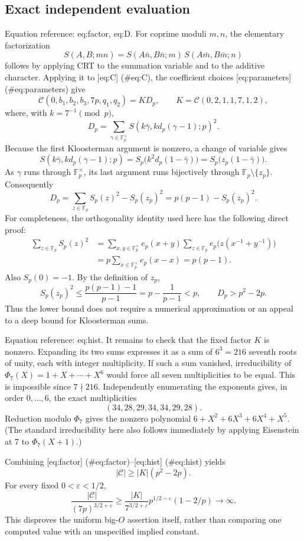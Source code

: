\documentclass[10pt]{article}
\begin{document}
\subsection*{Exact independent evaluation}
Equation reference: eq:factor, eq:D. For coprime moduli \(m,n\), the elementary factorization \[S(A,B;mn)=
 S(A\bar n,B\bar n;m)\,S(A\bar m,B\bar m;n)\] follows by applying CRT to the summation variable and to the additive character. Applying it to [eq:C] (\#eq:C), the coefficient choices [eq:parameters] (\#eq:parameters) give \[
 \mathcal C(0,b_1,b_2,b_3,7p,q_1,q_2)=K D_p,
 \qquad K=\mathcal C(0,2,1,1,7,1,2),\] where, with \(k=7^{-1}\pmod p\), \[D_p=\sum_{\gamma\in\mathbb F_p^\times}
         S(k\bar\gamma,kd_p(\gamma-1);p)^2.\] Because the first Kloosterman argument is nonzero, a change of variable gives \[S(k\bar\gamma,kd_p(\gamma-1);p)
       =S_p\bigl(k^2d_p(1-\bar\gamma)\bigr)
       =S_p\bigl(z_p(1-\bar\gamma)\bigr).\] As \(\gamma\) runs through \(\mathbb F_p^\times\), its last argument runs bijectively through \(\mathbb F_p\setminus\{z_p\}\). Consequently \[
 D_p=\sum_{z\in\mathbb F_p}S_p(z)^2-S_p(z_p)^2
     =p(p-1)-S_p(z_p)^2 .\] For completeness, the orthogonality identity used here has the following direct proof: \[\begin{aligned}
 \sum_{z\in\mathbb F_p} S_p(z)^2
 &=\sum_{x,y\in\mathbb F_p^\times}e_p(x+y)
                 \sum_{z\in\mathbb F_p}e_p\bigl(z(x^{-1}+y^{-1})\bigr)\\
 &=p\sum_{x\in\mathbb F_p^\times}e_p(x-x)=p(p-1).\end{aligned}\] Also \(S_p(0)=-1\). By the definition of \(z_p\), \[S_p(z_p)^2\le
 \frac{p(p-1)-1}{p-1}
 =p-\frac1{p-1}<p,
 \qquad D_p>p^2-2p.\] Thus the lower bound does not require a numerical approximation or an appeal to a deep bound for Kloosterman sums.\par
Equation reference: eq:hist. It remains to check that the fixed factor \(K\) is nonzero. Expanding its two sums expresses it as a sum of \(6^3=216\) seventh roots of unity, each with integer multiplicity. If such a sum vanished, irreducibility of \(\Phi_7(X)=1+X+\cdots+X^6\) would force all seven multiplicities to be equal. This is impossible since \(7\nmid216\). Independently enumerating the exponents gives, in order \(0,\ldots,6\), the exact multiplicities \[
 (34,28,29,34,34,29,28).\] Reduction modulo \(\Phi_7\) gives the nonzero polynomial \(6+X^2+6X^3+6X^4+X^5\). (The standard irreducibility here also follows immediately by applying Eisenstein at 7 to \(\Phi_7(X+1)\).)\par
Combining [eq:factor] (\#eq:factor)–[eq:hist] (\#eq:hist) yields \[|\mathcal C|\ge |K|(p^2-2p).\] For every fixed \(0<\varepsilon<1/2\), \[\frac{|\mathcal C|}{(7p)^{3/2+\varepsilon}}
 \ge
 \frac{|K|}{7^{3/2+\varepsilon}}
 p^{1/2-\varepsilon}(1-2/p)\longrightarrow\infty .\] This disproves the uniform big-\(O\) assertion itself, rather than comparing one computed value with an unspecified implied constant.\par
\end{document}
